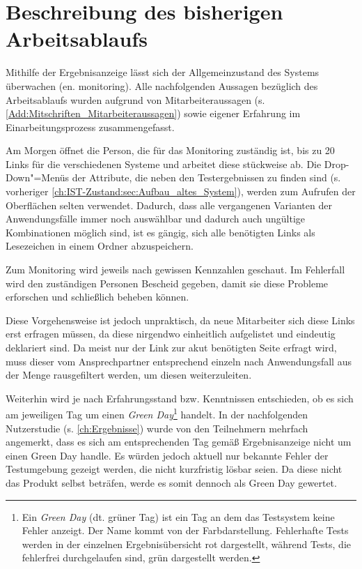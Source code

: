 \section{Beschreibung des bisherigen Arbeitsablaufs}
\label{ch:IST-Zustand:sec:Workflow}

Mithilfe der Ergebnisanzeige lässt sich der Allgemeinzustand des Systems überwachen (en. monitoring). Alle nachfolgenden Aussagen bezüglich des Arbeitsablaufs wurden aufgrund von Mitarbeiteraussagen (s. \autoref{Add:Mitschriften_Mitarbeiteraussagen}) sowie eigener Erfahrung im Einarbeitungsprozess zusammengefasst.


Am Morgen öffnet die Person, die für das Monitoring zuständig ist, bis zu 20 Links für die verschiedenen Systeme und arbeitet diese stückweise ab.
Die Drop-Down"=Menüs der Attribute, die neben den Testergebnissen zu finden sind (s. vorheriger \autoref{ch:IST-Zustand:sec:Aufbau_altes_System}), werden zum Aufrufen der Oberflächen selten verwendet. Dadurch, dass alle vergangenen Varianten der Anwendungsfälle immer noch auswählbar und dadurch auch ungültige Kombinationen möglich sind, ist es gängig, sich alle benötigten Links als Lesezeichen in einem Ordner abzuspeichern.

Zum Monitoring wird jeweils nach gewissen Kennzahlen geschaut. Im Fehlerfall wird den zuständigen Personen Bescheid gegeben, damit sie diese Probleme erforschen und schließlich beheben können.

Diese Vorgehensweise ist jedoch unpraktisch, da neue Mitarbeiter sich diese Links erst erfragen müssen, da diese nirgendwo einheitlich aufgelistet und eindeutig deklariert sind. Da meist nur der Link zur akut benötigten Seite erfragt wird, muss dieser vom Ansprechpartner entsprechend einzeln nach Anwendungsfall aus der Menge rausgefiltert werden, um diesen weiterzuleiten.

Weiterhin wird je nach Erfahrungsstand bzw. Kenntnissen entschieden, ob es sich am jeweiligen Tag um einen \textit{Green Day}\footnote{Ein \textit{Green Day} (dt. grüner Tag) ist ein Tag an dem das Testsystem keine Fehler anzeigt. Der Name kommt von der Farbdarstellung. Fehlerhafte Tests werden in der einzelnen Ergebnisübersicht rot dargestellt, während Tests, die fehlerfrei durchgelaufen sind, grün dargestellt werden.} handelt. In der nachfolgenden Nutzerstudie (s. \autoref{ch:Ergebnisse}) wurde von den Teilnehmern mehrfach angemerkt, dass es sich am entsprechenden Tag gemäß Er\-geb\-nis\-an\-zeige nicht um einen Green Day handle. Es würden jedoch aktuell nur bekannte Fehler der Testumgebung gezeigt werden, die nicht kurzfristig lösbar seien. Da diese nicht das Produkt selbst beträfen, werde es somit dennoch als Green Day gewertet.
